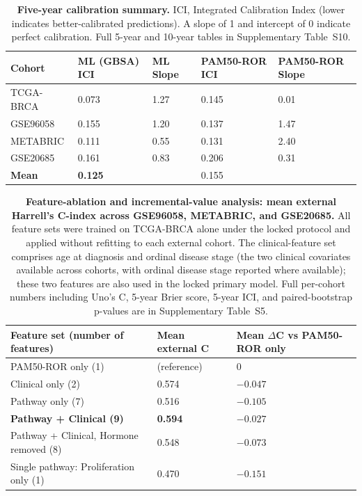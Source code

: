 \documentclass[11pt,letterpaper]{article}
\begin{document}
\begin{table}[H]
\caption{\textbf{Five-year calibration summary.} ICI, Integrated Calibration Index (lower indicates better-calibrated predictions). A slope of 1 and intercept of 0 indicate perfect calibration. Full 5-year and 10-year tables in Supplementary Table~S10.}
\label{tab:calibration}
\small
\begin{tabularx}{\textwidth}{lXXXX}
\toprule
\textbf{Cohort} & \textbf{ML (GBSA) ICI} & \textbf{ML Slope} & \textbf{PAM50-ROR ICI} & \textbf{PAM50-ROR Slope} \\
\midrule
TCGA-BRCA & 0.073 & 1.27 & 0.145 & 0.01 \\
GSE96058 & 0.155 & 1.20 & 0.137 & 1.47 \\
METABRIC & 0.111 & 0.55 & 0.131 & 2.40 \\
GSE20685 & 0.161 & 0.83 & 0.206 & 0.31 \\
\textbf{Mean} & \textbf{0.125} &  & 0.155 &  \\
\bottomrule
\end{tabularx}
\end{table}

\begin{table}[H]
\caption{\textbf{Feature-ablation and incremental-value analysis: mean external Harrell's C-index across GSE96058, METABRIC, and GSE20685.} All feature sets were trained on TCGA-BRCA alone under the locked protocol and applied without refitting to each external cohort. The clinical-feature set comprises age at diagnosis and ordinal disease stage (the two clinical covariates available across cohorts, with ordinal disease stage reported where available); these two features are also used in the locked primary model. Full per-cohort numbers including Uno's C, 5-year Brier score, 5-year ICI, and paired-bootstrap p-values are in Supplementary Table~S5.}
\label{tab:ablation}
\small
\begin{tabularx}{\textwidth}{lXX}
\toprule
\textbf{Feature set (number of features)} & \textbf{Mean external C} & \textbf{Mean $\Delta$C vs PAM50-ROR only} \\
\midrule
PAM50-ROR only (1) & (reference) & 0 \\
Clinical only (2) & 0.574 & $-0.047$ \\
Pathway only (7) & 0.516 & $-0.105$ \\
\textbf{Pathway + Clinical (9)} & \textbf{0.594} & \textbf{$-0.027$} \\
Pathway + Clinical, Hormone removed (8) & 0.548 & $-0.073$ \\
Single pathway: Proliferation only (1) & 0.470 & $-0.151$ \\
\bottomrule
\end{tabularx}
\end{table}
\end{document}
